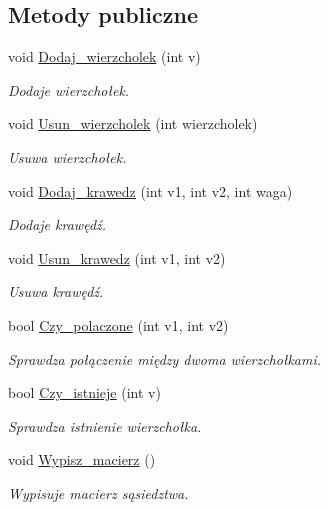 \subsection*{\-Metody publiczne}
\begin{DoxyCompactItemize}
\item 
void \hyperlink{class_graf_a1d04219ee7346afb627353c9d57b8cb2}{\-Dodaj\-\_\-wierzcholek} (int v)
\begin{DoxyCompactList}\small\item\em \-Dodaje wierzchołek. \end{DoxyCompactList}\item 
void \hyperlink{class_graf_ad1091bfe67b16460cd64aebdcbb5b521}{\-Usun\-\_\-wierzcholek} (int wierzcholek)
\begin{DoxyCompactList}\small\item\em \-Usuwa wierzchołek. \end{DoxyCompactList}\item 
void \hyperlink{class_graf_ae12b5623e92fa86ff51d51db1804e793}{\-Dodaj\-\_\-krawedz} (int v1, int v2, int waga)
\begin{DoxyCompactList}\small\item\em \-Dodaje krawędź. \end{DoxyCompactList}\item 
void \hyperlink{class_graf_af2ca22dd1730ce9067e484cf21db5b3f}{\-Usun\-\_\-krawedz} (int v1, int v2)
\begin{DoxyCompactList}\small\item\em \-Usuwa krawędź. \end{DoxyCompactList}\item 
bool \hyperlink{class_graf_affe4be381a025ca350ccc86ff68ea9d1}{\-Czy\-\_\-polaczone} (int v1, int v2)
\begin{DoxyCompactList}\small\item\em \-Sprawdza połączenie między dwoma wierzchołkami. \end{DoxyCompactList}\item 
bool \hyperlink{class_graf_a922eadf981e7dcd36bdbbdac102ee8e7}{\-Czy\-\_\-istnieje} (int v)
\begin{DoxyCompactList}\small\item\em \-Sprawdza istnienie wierzchołka. \end{DoxyCompactList}\item 
void \hyperlink{class_graf_a284d7f2e4bab1832220ce41fdef5d024}{\-Wypisz\-\_\-macierz} ()
\begin{DoxyCompactList}\small\item\em \-Wypisuje macierz sąsiedztwa. \end{DoxyCompactList}\item 

\end{DoxyCompactItemize}
